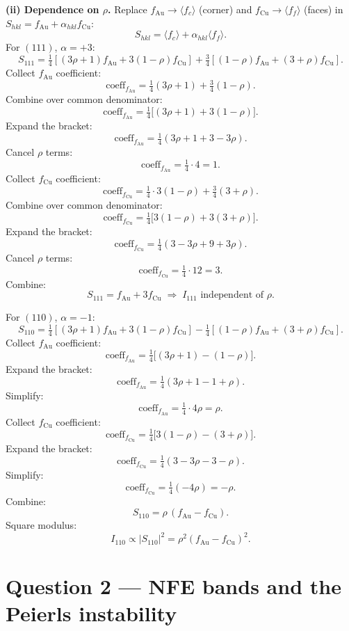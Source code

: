 \documentclass[11pt]{article}
\begin{document}
\textbf{(ii) Dependence on $\rho$.} Replace $f_{\text{Au}}\to\langle f_c\rangle$ (corner) and $f_{\text{Cu}}\to\langle f_f\rangle$ (faces) in $S_{hkl}=f_{\text{Au}}+\alpha_{hkl}f_{\text{Cu}}$:
\[ S_{hkl}=\langle f_c\rangle+\alpha_{hkl}\langle f_f\rangle. \]
For $(111)$, $\alpha=+3$:
\[ S_{111}=\tfrac14[(3\rho+1)f_{\text{Au}}+3(1-\rho)f_{\text{Cu}}]+\tfrac34[(1-\rho)f_{\text{Au}}+(3+\rho)f_{\text{Cu}}]. \]
Collect $f_{\text{Au}}$ coefficient:
\[ \text{coeff}_{f_{\text{Au}}}=\tfrac14(3\rho+1)+\tfrac34(1-\rho). \]
Combine over common denominator:
\[ \text{coeff}_{f_{\text{Au}}}=\tfrac14\bigl[(3\rho+1)+3(1-\rho)\bigr]. \]
Expand the bracket:
\[ \text{coeff}_{f_{\text{Au}}}=\tfrac14(3\rho+1+3-3\rho). \]
Cancel $\rho$ terms:
\[ \text{coeff}_{f_{\text{Au}}}=\tfrac14\cdot 4=1. \]
Collect $f_{\text{Cu}}$ coefficient:
\[ \text{coeff}_{f_{\text{Cu}}}=\tfrac14\cdot 3(1-\rho)+\tfrac34(3+\rho). \]
Combine over common denominator:
\[ \text{coeff}_{f_{\text{Cu}}}=\tfrac14\bigl[3(1-\rho)+3(3+\rho)\bigr]. \]
Expand the bracket:
\[ \text{coeff}_{f_{\text{Cu}}}=\tfrac14(3-3\rho+9+3\rho). \]
Cancel $\rho$ terms:
\[ \text{coeff}_{f_{\text{Cu}}}=\tfrac14\cdot 12=3. \]
Combine:
\begin{equation}
\boxed{\;S_{111}=f_{\text{Au}}+3f_{\text{Cu}}\;\Longrightarrow\;I_{111}\text{ independent of }\rho.\;}
\label{eq:S111-rho}
\end{equation}

For $(110)$, $\alpha=-1$:
\[ S_{110}=\tfrac14[(3\rho+1)f_{\text{Au}}+3(1-\rho)f_{\text{Cu}}]-\tfrac14[(1-\rho)f_{\text{Au}}+(3+\rho)f_{\text{Cu}}]. \]
Collect $f_{\text{Au}}$ coefficient:
\[ \text{coeff}_{f_{\text{Au}}}=\tfrac14\bigl[(3\rho+1)-(1-\rho)\bigr]. \]
Expand the bracket:
\[ \text{coeff}_{f_{\text{Au}}}=\tfrac14(3\rho+1-1+\rho). \]
Simplify:
\[ \text{coeff}_{f_{\text{Au}}}=\tfrac14\cdot 4\rho=\rho. \]
Collect $f_{\text{Cu}}$ coefficient:
\[ \text{coeff}_{f_{\text{Cu}}}=\tfrac14\bigl[3(1-\rho)-(3+\rho)\bigr]. \]
Expand the bracket:
\[ \text{coeff}_{f_{\text{Cu}}}=\tfrac14(3-3\rho-3-\rho). \]
Simplify:
\[ \text{coeff}_{f_{\text{Cu}}}=\tfrac14(-4\rho)=-\rho. \]
Combine:
\[ S_{110}=\rho\,(f_{\text{Au}}-f_{\text{Cu}}). \]
Square modulus:
\begin{equation}
\boxed{\;I_{110}\propto|S_{110}|^2=\rho^2(f_{\text{Au}}-f_{\text{Cu}})^2.\;}
\label{eq:S110-rho}
\end{equation}

\section*{Question 2 --- NFE bands and the Peierls instability}
\end{document}
